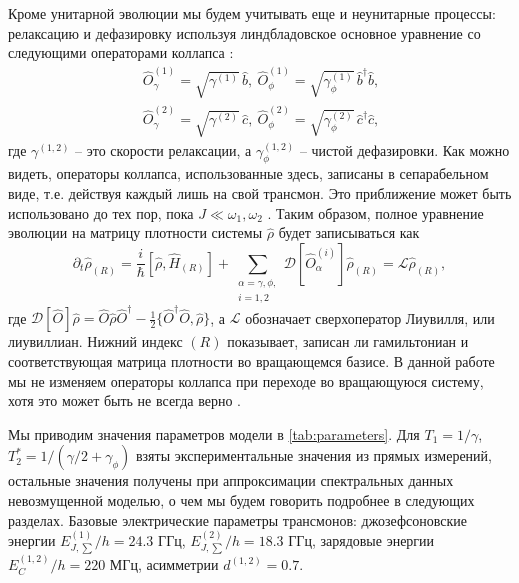 \documentclass[14pt, a4paper]{extreport}
\numberwithin{equation}{section}
\begin{document}
Кроме унитарной эволюции мы будем учитывать еще и неунитарные процессы: релаксацию и дефазировку используя линдбладовское основное уравнение со следующими операторами коллапса \cite{bishop2010circuit}:
\begin{equation}\
\begin{split}
\hat{{O}}_{\gamma}^{(1)} = \sqrt{\gamma^{(1)}}\, \hat b,\ 
\hat{{O}}_{\phi}^{(1)} = \sqrt{\gamma_{\phi}^{(1)}}\, 
\hat b^\dag \hat b,\\
\hat{{O}}_{\gamma}^{(2)} = \sqrt{\gamma^{(2)}}\, \hat c,\ 
\hat{{O}}_{\phi}^{(2)} = \sqrt{\gamma_{ \phi}^{(2)}}\, 
\hat c^\dag \hat c,
\end{split}
\end{equation}
где $\gamma^{(1,2)}$ -- это скорости релаксации, а $\gamma_{\phi}^{(1,2)}$ -- чистой дефазировки. Как можно видеть, операторы коллапса, использованные здесь, записаны в сепарабельном виде, т.е. действуя каждый лишь на свой трансмон. Это приближение может быть использовано до тех пор, пока $J\ll\omega_1,\omega_2$ \cite{beaudoin2011dissipation}. Таким образом, полное уравнение эволюции на матрицу плотности системы $\hat \rho$ будет записываться как
\begin{equation}
\partial_t \hat \rho_{(R)} = \frac{i}{\hbar}[\hat 
\rho, \hat H_{(R)}] + \sum_{\substack{\alpha = {\gamma, \phi},\\ i=1,2}} 
\mathcal{D}[\hat{O}_{\alpha}^{(i)}] \hat \rho_{(R)} 
= \mathcal{L}\hat\rho_{(R)}, \label{eq:master}
\end{equation}
где $\mathcal{D}[\hat{{O}}]\hat \rho = 
\hat{{O}} \hat \rho \hat{{O}}^\dag - 
\frac{1}{2}\{ \hat{{O}}^\dag \hat{{O}}, \hat 
\rho\}$, а $\mathcal{L}$ обозначает сверхоператор Лиувилля, или лиувиллиан. Нижний индекс $(R)$ показывает, записан ли гамильтониан и соответствующая матрица плотности во вращающемся базисе. В данной работе мы не изменяем операторы коллапса при переходе во вращающуюся систему, хотя это может быть не всегда верно \cite{shavit2019bridging}.

Мы приводим значения параметров модели в \autoref{tab:parameters}. Для $T_1 = 1/\gamma$, $T_2^* = 1/(\gamma/2 + \gamma_\phi)$ взяты экспериментальные значения из прямых измерений, остальные значения получены при аппроксимации спектральных данных невозмущенной моделью, о чем мы будем говорить подробнее в следующих разделах. Базовые электрические параметры трансмонов: джозефсоновские энергии $E^{(1)}_{J, \sum}/h = 24.3$ ГГц, $E^{(2)}_{J,\sum}/h = 18.3$ ГГц,  зарядовые энергии $E^{(1,2)}_C/h = 220$ МГц, асимметрии $d^{(1,2)} = 0.7$.
\end{document}
